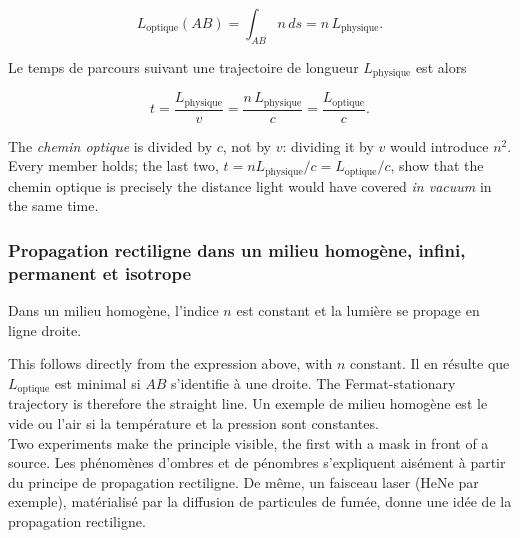 \[ L_{\text{optique}}(AB) = \int_{AB} n\, ds = n\, L_{\text{physique}}. \]

Le temps de parcours suivant une trajectoire de longueur $L_{\text{physique}}$
est alors

\[ t = \frac{L_{\text{physique}}}{v}
     = \frac{n\, L_{\text{physique}}}{c}
     = \frac{L_{\text{optique}}}{c}. \]

\begin{remark}
  The \emph{chemin optique} is divided by $c$, not by $v$: dividing it by $v$
  would introduce $n^{2}$. Every member holds; the last two,
  $t = n L_{\text{physique}}/c = L_{\text{optique}}/c$, show that the chemin optique is
  precisely the distance light would have covered \emph{in vacuum} in the same
  time.
\end{remark}

\subsubsection{Propagation rectiligne dans un milieu homogène, infini, permanent et isotrope}

\begin{postulate}
  Dans un milieu homogène, l'indice $n$ est constant et la lumière se propage en
  ligne droite.
\end{postulate}

This follows directly from the expression above, with $n$ constant. Il en résulte
que $L_{\text{optique}}$ est minimal si $AB$ s'identifie à une droite. The
Fermat-stationary trajectory is therefore the straight line. Un exemple de milieu
homogène est le vide ou l'air si la température et la pression sont constantes.\\

Two experiments make the principle visible, the first with a mask in front of a
source. Les phénomènes d'ombres et de pénombres s'expliquent aisément à partir du
principe de propagation rectiligne. De même, un faisceau laser (HeNe par
exemple), matérialisé par la diffusion de particules de fumée, donne une idée de
la propagation rectiligne.

